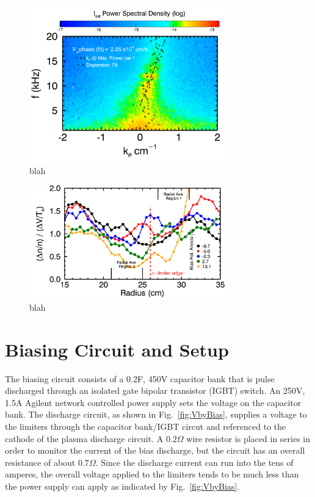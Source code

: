\documentclass[aip,pop,amsmath,amssymb,preprint,superscriptaddress]{revtex4-1} %
\begin{document}
\begin{figure}[!htbp]
\centerline{
\includegraphics[width=8.5cm]{k_spec_vs_freq_highbias}}
\caption{\label{fig:k_spec_vs_freq_highbias} blah}
\end{figure}

\begin{figure}[!htbp]
\centerline{
\includegraphics[width=8.5cm]{vf_vs_dens_flucs}}
\caption{\label{fig:vf_vs_dens_flucs} blah}
\end{figure}

\section{Biasing Circuit and Setup}

The biasing circuit consists of a 0.2F, 450V capacitor bank that is pulse discharged through an isolated gate bipolar transistor (IGBT) switch. An 250V, 1.5A Agilent network controlled power supply sets the voltage on the capacitor bank. The discharge circuit, as shown in Fig.~\ref{fig:VbyBias}, supplies a voltage to the limiters through the capacitor bank/IGBT circut and referenced to the cathode of the plasma discharge circuit. A $0.2 \Omega$ wire resistor is placed in series in order to monitor the current of the bias discharge, but the circuit has an overall resistance of about $0.7 \Omega$. Since the discharge current can run into the tens of amperes, the overall voltage applied to the limiters tends to be much less than the power supply can apply as indicated by Fig.~\ref{fig:VbyBias}. 
\end{document}
